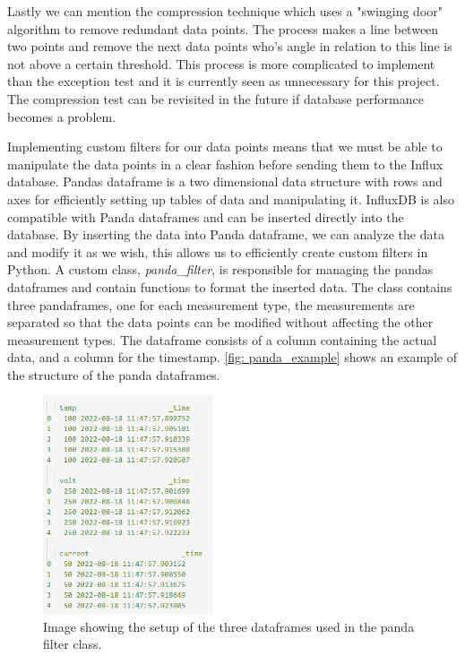 \documentclass[main.tex]{subfiles}
\begin{document}
 Lastly we can mention the compression technique which uses a "swinging door" algorithm to remove redundant data points. The process makes a line between two points and remove the next data points who's angle in relation to this line is not above a certain threshold. This process is more complicated to implement than the exception test and it is currently seen as unnecessary for this project. The compression test can be revisited in the future if database performance becomes a problem.
 
 Implementing custom filters for our data points means that we must be able to manipulate the data points in a clear fashion before sending them to the Influx database. Pandas dataframe is a two dimensional data structure with rows and axes for efficiently setting up tables of data and manipulating it. InfluxDB is also compatible with Panda dataframes and can be inserted directly into the database. By inserting the data into Panda dataframe, we can analyze the data and modify it as we wish, this allows us to efficiently create custom filters in Python. A custom class, \textit{panda\_filter}, is responsible for managing the pandas dataframes and contain functions to format the inserted data. The class contains three pandaframes, one for each measurement type, the measurements are separated so that the data points can be modified without affecting the other measurement types. The dataframe consists of a column containing the actual data, and a column for the timestamp. \autoref{fig: panda_example} shows an example of the structure of the panda dataframes. 
 
 \begin{figure}[!htpb]
    \centering
    \includegraphics[width=5cm, scale=1]{images/panda_frame_example.png}
    \caption{Image showing the setup of the three dataframes used in the panda filter class.}
    \label{fig: panda_example}
\end{figure}
\FloatBarrier 
\end{document}
